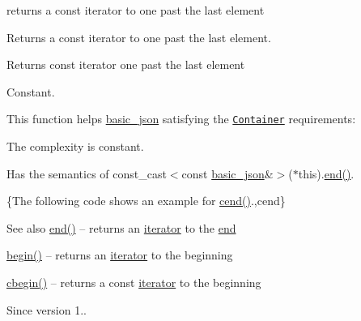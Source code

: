 returns a const iterator to one past the last element 

Returns a const iterator to one past the last element.

 \begin{DoxyReturn}{Returns}
const iterator one past the last element
\end{DoxyReturn}
Constant.

This function helps {\ttfamily \hyperlink{classnlohmann_1_1basic__json}{basic\+\_\+json}} satisfying the \href{https://en.cppreference.com/w/cpp/named_req/Container}{\tt Container} requirements\+:
\begin{DoxyItemize}
\item The complexity is constant.
\item Has the semantics of {\ttfamily const\+\_\+cast$<$const \hyperlink{classnlohmann_1_1basic__json}{basic\+\_\+json}\&$>$($\ast$this).\hyperlink{classnlohmann_1_1basic__json_a931267ec3f09eb67e4382f321b2c52bc}{end()}}.
\end{DoxyItemize}

\{The following code shows an example for {\ttfamily \hyperlink{classnlohmann_1_1basic__json_a3017cf0f1a4673e904e34cfef62e7758}{cend()}}.,cend\}

\begin{DoxySeeAlso}{See also}
\hyperlink{classnlohmann_1_1basic__json_a931267ec3f09eb67e4382f321b2c52bc}{end()} -- returns an \hyperlink{classnlohmann_1_1basic__json_aa549b2b382916b3baafb526e5cb410bd}{iterator} to the \hyperlink{classnlohmann_1_1basic__json_a931267ec3f09eb67e4382f321b2c52bc}{end} 

\hyperlink{classnlohmann_1_1basic__json_a23b495b4c282e4afacf382f5b49af7c7}{begin()} -- returns an \hyperlink{classnlohmann_1_1basic__json_aa549b2b382916b3baafb526e5cb410bd}{iterator} to the beginning 

\hyperlink{classnlohmann_1_1basic__json_ae508c13e3ad6ce445bcaf24a2bc7d039}{cbegin()} -- returns a const \hyperlink{classnlohmann_1_1basic__json_aa549b2b382916b3baafb526e5cb410bd}{iterator} to the beginning
\end{DoxySeeAlso}
\begin{DoxySince}{Since}
version 1.. 
\end{DoxySince}
